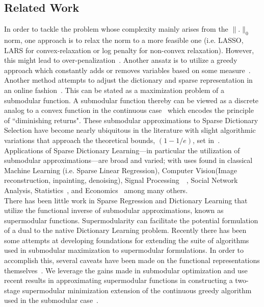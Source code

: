 \documentclass{article}
\begin{document}
\subsection{Related Work}\label{sec:prior-work}

In order to tackle the problem whose complexity mainly arises from the $\| .\|_0$ norm, one approach is to relax the norm to a more feasible one (i.e. LASSO, LARS for convex-relaxation or log penalty for non-convex relaxation). However, this might lead to over-penalization~\cite{nonconvexrelax}. Another ansatz is to utilize a greedy approach which constantly adds or removes variables based on some measure~\cite{submod_spectral}.  Another method attempts to adjust the dictionary and sparse representation in an online fashion~\cite{mairal09}. This can be stated as a maximization problem of a submodular function. A submodular function thereby can be viewed as a discrete analog to a convex function in the continuous case~\cite{submod_sparsecoding} which encodes the principle of ``diminishing returns". These submodular approximations to Sparse Dictionary Selection have become nearly ubiquitous in the literature with slight algorithmic variations that approach the theoretical bounds, $(1 - 1/e)$, set in~\cite{Krause05near-optimalnonmyopic}.
\\

\noindent Applications of Sparse Dictionary Learning---in particular the utilization of submodular approximations---are broad and varied; with uses found in classical Machine Learning (i.e. Sparse Linear Regression), Computer Vision(Image reconstruction, inpainting, denoising), Signal Processing~\cite{submod_sparsecoding}~\cite{nonconvexrelax}, Social Network Analysis, Statistics~\cite{rIBP}, and Economics~\cite{utilityWelfare} among many others. 
\\

\noindent There has been little work in Sparse Regression and Dictionary Learning that utilize the functional inverse of submodular approximations, known as supermodular functions. Supermodularity can facilitate the potential formulation of a dual to the native Dictionary Learning problem. Recently there has been some attempts at developing foundations for extending the suite of algorithms used in submodular maximization to supermodular formulations. In order to accomplish this, several caveats have been made on the functional representations themselves~\cite{weaklyalpha}. We leverage the gains made in submodular optimization and use recent results in approximating supermodular functions in constructing a two-stage supermodular minimization extension of the continuous greedy algorithm used in the submodular case~\cite{Singer16TwoStage}.
\end{document}
